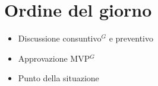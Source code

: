 \section*{Ordine del giorno}

\begin{itemize}
	\item Discussione consuntivo$^G$ e preventivo
	\item Approvazione MVP$^G$
	\item Punto della situazione
\end{itemize}

